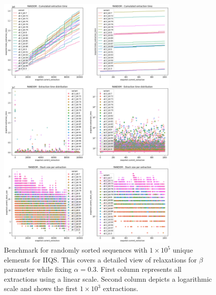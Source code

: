 \begin{figure}[p]
    \centering
    \includegraphics[width=0.79\textwidth]{./fragments/04_experimental_execution/images/04_alphabeta_detail_random_right.png}
    \caption{Benchmark for randomly sorted sequences with $1\times10^5$ unique elements for IIQS. This covers a detailed view of relaxations for $\beta$ parameter while fixing $\alpha=0.3$.  First column represents all extractions using a linear scale. Second column depicts a logarithmic scale and shows the first $1\times10^3$ extractions. }
    \label{FIG:05_ALPHABETA_BENCHMARK_RANDOM_RIGHT}
\end{figure}

